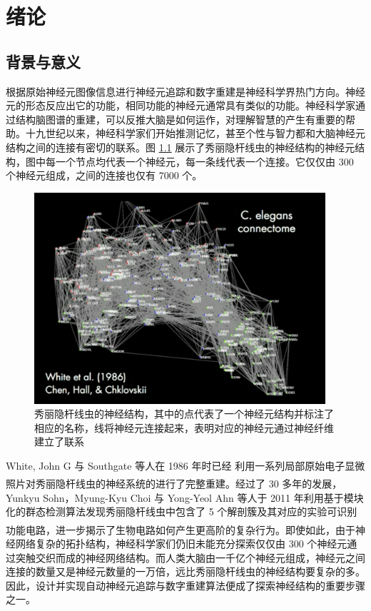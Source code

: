 \newcommand{\upcite}[1]{\textsuperscript{\textsuperscript{\cite{#1}}}}
\chapter{绪论}
\section{背景与意义}

根据原始神经元图像信息进行神经元追踪和数字重建是神经科学界热门方向。神经元的形态反应出它的功能，相同功能的神经元通常具有类似的功能。神经科学家通过结构脑图谱的重建，可以反推大脑是如何运作，对理解智慧的产生有重要的帮助。十九世纪以来，神经科学家们开始推测记忆，甚至个性与智力都和大脑神经元结构之间的连接有密切的联系。图 \ref{worm} 展示了秀丽隐杆线虫的神经结构的神经元结构，图中每一个节点均代表一个神经元，每一条线代表一个连接。它仅仅由 300 个神经元组成，之间的连接也仅有 7000 个。

\begin{figure}[!ht]
\centering
\includegraphics[width=108mm]{images/worm}
\caption{秀丽隐杆线虫的神经结构，其中的点代表了一个神经元结构并标注了相应的名称，线将神经元连接起来，表明对应的神经元通过神经纤维建立了联系}
\label{worm}
\end{figure}

White, John G 与 Southgate 等人在 1986 年时已经 利用一系列局部原始电子显微照片对秀丽隐杆线虫的神经系统的进行了完整重建\upcite{white1986structure}。经过了 30 多年的发展，Yunkyu Sohn，Myung-Kyu Choi 与 Yong-Yeol Ahn 等人于 2011 年利用基于模块化的群态检测算法发现秀丽隐杆线虫中包含了 5 个解剖簇及其对应的实验可识别功能电路，进一步揭示了生物电路如何产生更高阶的复杂行为\upcite{varshney2011structural}。即使如此，由于神经网络复杂的拓扑结构，神经科学家们仍旧未能充分探索仅仅由 300 个神经元通过突触交织而成的神经网络结构。而人类大脑由一千亿个神经元组成，神经元之间连接的数量又是神经元数量的一万倍，远比秀丽隐杆线虫的神经结构要复杂的多。因此，设计并实现自动神经元追踪与数字重建算法便成了探索神经结构的重要步骤之一。

